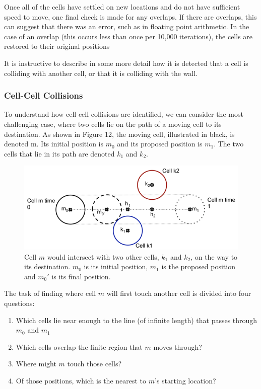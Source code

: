 \documentclass[12pt]{article}
\begin{document}
Once all of the cells have settled on new locations and do not have 
sufficient speed to move, one final check is made for any overlaps. If 
there are overlaps, this can suggest that there was an error, such as in 
floating point arithmetic. In the case of an overlap (this occurs less 
than once per 10,000 iterations), the cells are restored to their 
original positions

It is instructive to describe in some more detail how it is detected 
that a cell is colliding with another cell, or that it is colliding with 
the wall.

\subsubsection{Cell-Cell Collisions}
To understand how cell-cell collisions are identified, we can consider 
the most challenging case, where two cells lie on the path of a moving 
cell to its destination. As shown in Figure 12, the moving cell, 
illustrated in black, is denoted m. Its initial position is \(m_0\) 
and its proposed position is \(m_1\). The two cells that lie in its 
path are denoted \(k_1\) and \(k_2\).

\begin{figure}[H]
\centering
\includegraphics[width=\textwidth]{media/collision.png}
\caption{Cell \(m\) would intersect with two other 
  cells, \(k_1\) and \(k_2\), on the way to its destination. 
  \(m_0\) is its initial position, \(m_1\) is the proposed position and 
\(m_0'\) is its final position.}
\end{figure}

The task of finding where cell \(m\) will first touch another 
cell is divided into four questions:

\begin{enumerate}
\item Which cells lie near enough to the line (of infinite length) that 
passes through \(m_0\) and \(m_1\)
\item Which cells overlap the finite region that \(m\) moves 
through?
\item Where might \(m\) touch those cells?
\item Of those positions, which is the nearest to \(m\)'s 
starting location?
\end{enumerate}
\end{document}

